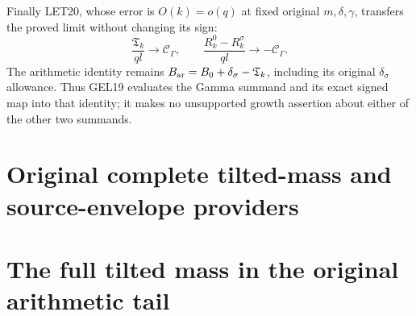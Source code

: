 \documentclass[11pt,a4paper]{article}
\begin{document}
Finally LET20, whose error is \(O(k)=o(q)\) at fixed original
\(m,\delta,\gamma\), transfers the proved limit without changing its sign:
\[
 \frac{\mathfrak T_k}{ql}\longrightarrow\mathcal C_\Gamma,
 \qquad
 \frac{R_k^0-R_k^\sigma}{ql}\longrightarrow-\mathcal C_\Gamma.
 \tag{GEL19}
\]
The arithmetic identity remains
\(B_{\rm ar}=B_0+\delta_\sigma-\mathfrak T_k\), including its original
\(\delta_\sigma\) allowance. Thus GEL19 evaluates the Gamma summand
and its exact signed map into that identity; it makes no unsupported
growth assertion about either of the other two summands.




\endgroup

\clearpage
\begingroup


\setcounter{equation}{0}
\renewcommand{\theequation}{RTM.\arabic{equation}}
\section*{Original complete tilted-mass and source-envelope providers}
\section{The full tilted mass in the original arithmetic tail}
\label{rtm:sec:retained-tilted-mass-tail}
\end{document}

